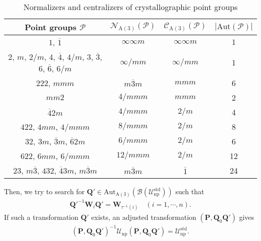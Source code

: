\begin{table}[tb]
  \centering
  \caption{Normalizers and centralizers of crystallographic point groups}
  \label{tab:normalizer_centralizer_pg}
  \begin{tabular}{cccc}
    \hline \hline
    Point groups $\mathcal{P}$
      & $\mathcal{N}_{\mathrm{A}(3)}(\mathcal{P})$
      & $\mathcal{C}_{\mathrm{A}(3)}(\mathcal{P})$
      & $ | \mathrm{Aut}(\mathcal{P}) | $ \\
    \hline
    $1$, $\overline{1}$ & $\infty\infty m$ & $\infty\infty m$ & $1$ \\
    $2$, $m$, $2/m$, $4$, $\overline{4}$, $4/m$, $3$, $\overline{3}$, $6$, $\overline{6}$, $6/m$
      & $\infty / m m$ & $\infty / m m$ & $1$ \\
    $222$, $mmm$ & $m\overline{3}m$ & $mmm$ & 6 \\
    $mm2$ & $4/mmm$ & $mmm$ & 2 \\ %
    $\overline{4}2m$ & $4/mmm$ & $2/m$ & 4 \\
    $422$, $4mm$, $4/mmm$ & $8/mmm$ & $2/m$ & 8 \\
    $32$, $3m$, $\overline{3}m$, $\overline{6}2m$ & $6/mmm$ & $2/m$ & 6 \\
    $622$, $6mm$, $6/mmm$ & $12/mmm$ & $2/m$ & 12 \\
    $23$, $m\overline{3}$, $432$, $\overline{4}3m$, $m\overline{3}m$
      & $m\overline{3}m$ & $\overline{1}$ & 24 \\ %
    \hline \hline
  \end{tabular}
\end{table}

Then, we try to search for $\bm{Q}' \in \mathrm{Aut}_{\mathrm{A}(3)}(\mathcal{B}(\mathcal{U}_{\mathrm{np}}^{\mathrm{std}}))$ such that
\begin{align}
  \bm{Q}'^{-1} \bm{W}_{i} \bm{Q}' = \bm{W}_{\tau^{-1}(i)}
    \quad (i = 1, \cdots, n).
\end{align}
If such a transformation $\bm{Q}'$ exists, an adjusted transformation $(\bm{P}, \bm{Q}_{0}\bm{Q}')$ gives
\begin{align}
  (\bm{P}, \bm{Q}_{0}\bm{Q}')^{-1} \mathcal{U}_{\mathrm{np}} (\bm{P}, \bm{Q}_{0}\bm{Q}') = \mathcal{U}_{\mathrm{np}}^{\mathrm{std}}.
\end{align}


%
